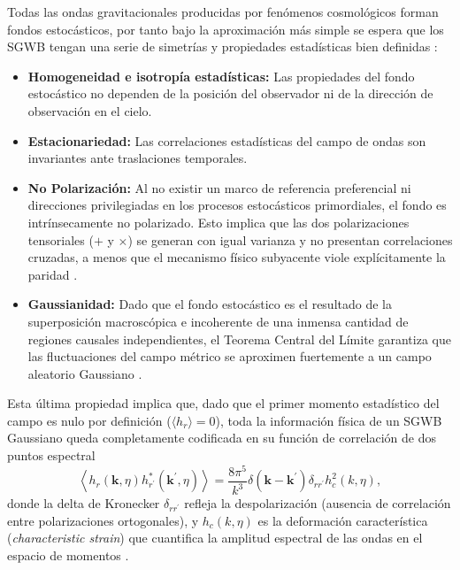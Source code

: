 Todas las ondas gravitacionales producidas por fenómenos cosmológicos forman fondos estocásticos, por tanto bajo la aproximación más simple se espera que los SGWB tengan una serie de simetrías y propiedades estadísticas bien definidas \cite{Christensen_2018}:
\begin{itemize}
    \item \textbf{Homogeneidad e isotropía estadísticas:} Las propiedades del fondo estocástico no dependen de la posición del observador ni de la dirección de observación en el cielo.
    \item \textbf{Estacionariedad:} Las correlaciones estadísticas del campo de ondas son invariantes ante traslaciones temporales.
    \item \textbf{No Polarización:} Al no existir un marco de referencia preferencial ni direcciones privilegiadas en los procesos estocásticos primordiales, el fondo es intrínsecamente no polarizado. Esto implica que las dos polarizaciones tensoriales ($+$ y $\times$) se generan con igual varianza y no presentan correlaciones cruzadas, a menos que el mecanismo físico subyacente viole explícitamente la paridad \cite{Renzini2022}.
    \item \textbf{Gaussianidad:} Dado que el fondo estocástico es el resultado de la superposición macroscópica e incoherente de una inmensa cantidad de regiones causales independientes, el Teorema Central del Límite garantiza que las fluctuaciones del campo métrico se aproximen fuertemente a un campo aleatorio Gaussiano \cite{Renzini2022, Christensen_2018}. 
\end{itemize}

Esta última propiedad implica que, dado que el primer momento estadístico del campo es nulo por definición ($\langle h_r \rangle = 0$), toda la información física de un SGWB Gaussiano queda completamente codificada en su función de correlación de dos puntos espectral
\begin{equation}
    \left\langle h_r(\textbf{k}, \eta) h_{r^\prime}^*(\textbf{k}^\prime, \eta) \right\rangle = \frac{8\pi^5}{k^3} \delta(\textbf{k} - \textbf{k}^\prime) \delta_{r r^\prime} h_c^2(k, \eta),
\end{equation}
donde la delta de Kronecker $\delta_{r r^\prime}$ refleja la despolarización (ausencia de correlación entre polarizaciones ortogonales), y $h_c(k, \eta)$ es la deformación característica (\textit{characteristic strain}) que cuantifica la amplitud espectral de las ondas en el espacio de momentos \cite{Christensen_2018}.

